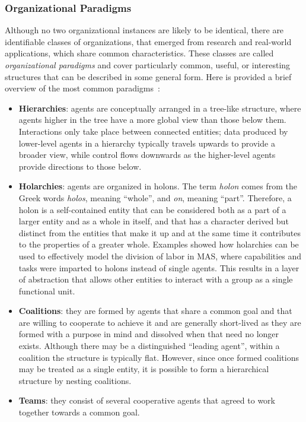\subsubsection{Organizational Paradigms}
Although no two organizational instances are likely to be identical, there are identifiable classes of organizations, that emerged from research and real-world applications, which share common characteristics.
These classes are called \textit{organizational paradigms} and cover particularly common, useful, or interesting structures that can be described in some general form.
Here is provided a brief overview of the most common paradigms~\cite{horling_lesser_2004}:
\begin{itemize}
    \item \textbf{Hierarchies}: agents are conceptually arranged in a tree-like structure, where agents higher in the tree have a more global view than those below them.
    Interactions only take place between connected entities; data produced by lower-level agents in a hierarchy typically travels upwards to provide a broader view, while control flows downwards as the higher-level agents provide directions to those below.
    \item \textbf{Holarchies}: agents are organized in holons.
    The term \textit{holon} comes from the Greek words \textit{holos}, meaning ``whole'', and \textit{on}, meaning ``part''. Therefore, a holon is a self-contained entity that can be considered both as a part of a larger entity and as a whole in itself, and that has a character derived but distinct from the entities that make it up and at the same time it contributes to the properties of a greater whole.
    Examples showed how holarchies can be used to effectively model the division of labor in MAS, where capabilities and tasks were imparted to holons instead of single agents.
    This results in a layer of abstraction that allows other entities to interact with a group as a single functional unit.
    \item \textbf{Coalitions}: they are formed by agents that share a common goal and that are willing to cooperate to achieve it and are generally short-lived as they are formed with a purpose in mind and dissolved when that need no longer exists.
    Although there may be a distinguished ``leading agent'', within a coalition the structure is typically flat.
    However, since once formed coalitions may be treated as a single entity, it is possible to form a hierarchical structure by nesting coalitions.
    \item \textbf{Teams}: they consist of several cooperative agents that agreed to work together towards a common goal.

\end{itemize}
